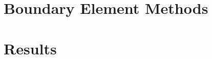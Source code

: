\documentclass[twoside, 13pt]{report}
\begin{document}
\chapter{Boundary Element Methods}\label{chap:bemethod}


\chapter{Results}\label{chap:results}


\cleardoublepage %



\nocite{*}


\glsaddallunused
\printglossaries

%
\end{document}
